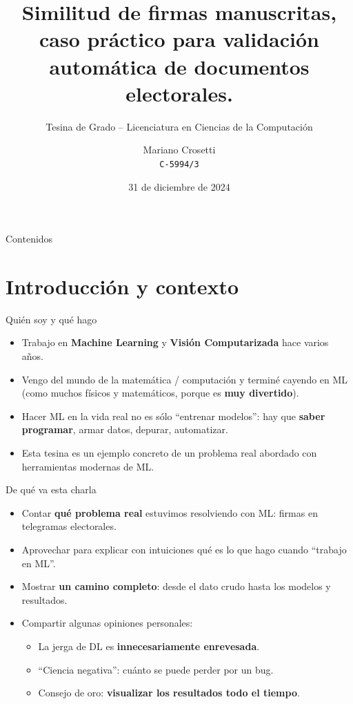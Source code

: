 \documentclass{beamer}
\title[Similitud de firmas manuscritas]{Similitud de firmas manuscritas, caso práctico para validación automática de documentos electorales.}
\subtitle{Tesina de Grado – Licenciatura en Ciencias de la Computación}
\author[Mariano Crosetti]{Mariano Crosetti\\\texttt{C-5994/3}}
\institute[UNR]{Universidad Nacional de Rosario\\[0.5em] Rosario, Argentina\\[0.5em] Director: Dante Zanarini\\Co-director: Pablo Granitto}
\date[Defensa de Tesina]{31 de diciembre de 2024}
\begin{document}

\begin{frame}
  \titlepage
\end{frame}

\begin{frame}{Contenidos}
  \tableofcontents
\end{frame}


\section{Introducción y contexto}

\begin{frame}{Quién soy y qué hago}
  \begin{itemize}
    \item Trabajo en \textbf{Machine Learning} y \textbf{Visión Computarizada} hace varios años.
    \item Vengo del mundo de la matemática / computación y terminé cayendo en ML (como muchos físicos y matemáticos, porque es \textbf{muy divertido}).
    \item Hacer ML en la vida real no es sólo ``entrenar modelos'': hay que \textbf{saber programar}, armar datos, depurar, automatizar.
    \item Esta tesina es un ejemplo concreto de un problema real abordado con herramientas modernas de ML.
  \end{itemize}
\end{frame}

\begin{frame}{De qué va esta charla}
  \begin{itemize}
    \item Contar \textbf{qué problema real} estuvimos resolviendo con ML: firmas en telegramas electorales.
    \item Aprovechar para explicar con intuiciones qué es lo que hago cuando ``trabajo en ML''.
    \item Mostrar \textbf{un camino completo}: desde el dato crudo hasta los modelos y resultados.
    \item Compartir algunas opiniones personales:
      \begin{itemize}
        \item La jerga de DL es \textbf{innecesariamente enrevesada}.
        \item ``Ciencia negativa'': cuánto se puede perder por un bug.
        \item Consejo de oro: \textbf{visualizar los resultados todo el tiempo}.
      \end{itemize}
  \end{itemize}
\end{frame}
\end{document}
